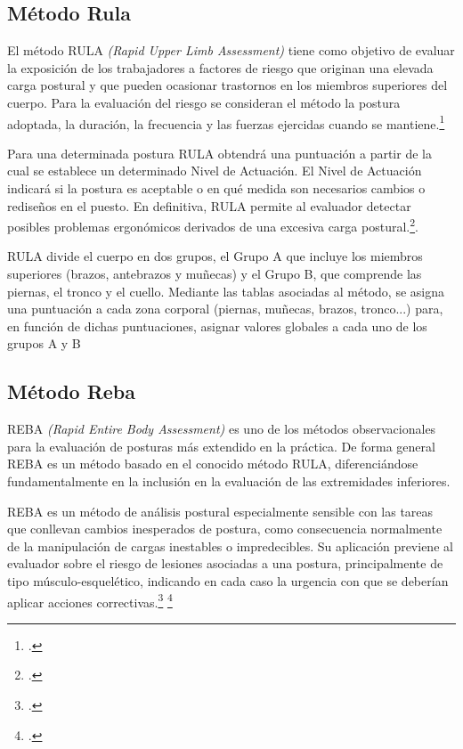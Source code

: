 \subsection{Método Rula}
El método RULA \textit{(Rapid Upper Limb Assessment)} tiene como objetivo de evaluar la exposición de los trabajadores a factores de riesgo que originan una elevada carga postural y que pueden ocasionar trastornos en los miembros superiores del cuerpo. Para la evaluación del riesgo se consideran el método la postura adoptada, la duración, la frecuencia y las fuerzas ejercidas cuando se mantiene.\footcite[2]{Mcatamney1993RULA:Disorders} 
\parencite[2]{Mcatamney1993RULA:Disorders}


Para una determinada postura RULA obtendrá una puntuación a partir de la cual se establece un determinado Nivel de Actuación. El Nivel de Actuación indicará si la postura es aceptable o en qué medida son necesarios cambios o rediseños en el puesto. En definitiva, RULA permite al evaluador detectar posibles problemas ergonómicos derivados de una excesiva carga postural.\footcite{Diego-Mas2015EvaluacionRULA}.

RULA divide el cuerpo en dos grupos, el Grupo A que incluye los miembros superiores (brazos, antebrazos y muñecas) y el Grupo B, que comprende las piernas, el tronco y el cuello. Mediante las tablas asociadas al método, se asigna una puntuación a cada zona corporal (piernas, muñecas, brazos, tronco...) para, en función de dichas puntuaciones, asignar valores globales a cada uno de los grupos A y B
\subsection{Método Reba}
REBA \textit{(Rapid Entire Body Assessment)} es uno de los métodos observacionales para la evaluación de posturas más extendido en la práctica. De forma general REBA es un método basado en el conocido método RULA, diferenciándose fundamentalmente en la inclusión en la evaluación de las extremidades inferiores.

REBA es un método de análisis postural especialmente sensible con las tareas que conllevan cambios inesperados de postura, como consecuencia normalmente de la manipulación de cargas inestables o impredecibles. Su aplicación previene al evaluador sobre el riesgo de lesiones asociadas a una postura, principalmente de tipo músculo-esquelético, indicando en cada caso la urgencia con que se deberían aplicar acciones correctivas.\footcite{Hignett2000RapidREBA} \footcite{Diego-Mas2015EvaluacionREBA}

